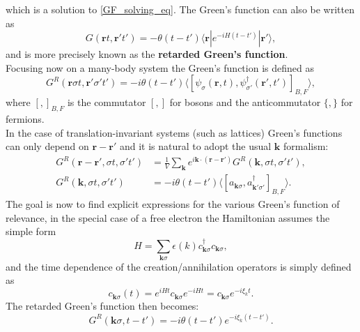 which is a solution to \ref{GF_solving_eq}.
The Green's function can also be written as
\begin{equation}
    G(\mathbf{r}t,\mathbf{r}'t')=-\theta(t-t')\langle \mathbf{r}|e^{-iH(t-t')}|\mathbf{r}'\rangle,
\end{equation}
and is more precisely known as the \textbf{retarded Green's function}.\\
Focusing now on a many-body system the Green's function is defined as
\begin{equation}
    G^R(\mathbf{r}\sigma t,\mathbf{r}'\sigma't')=-i\theta(t-t')\langle[\psi_\sigma(\mathbf{r},t),\psi^\dagger_{\sigma'}(\mathbf{r}',t')]_{B,F}\rangle,
\end{equation}
where $[,]_{B,F}$ is the commutator $[,]$ for bosons and the anticommutator $\{,\}$ for fermions.\\
In the case of translation-invariant systems (such as lattices) Green's functions can only depend on $\mathbf{r}-\mathbf{r}'$ and 
it is natural to adopt the usual $\mathbf{k}$ formalism:
\begin{equation}
\begin{split}
    G^R(\mathbf{r}-\mathbf{r}',\sigma t,\sigma' t')&=\frac{1}{V}\sum_\mathbf{k}e^{i\mathbf{k}\cdot(\mathbf{r}-\mathbf{r}')}G^R(\mathbf{k},\sigma t,\sigma' t'),\\
    G^R(\mathbf{k},\sigma t,\sigma' t')&=-i\theta (t-t')\langle [a_{\mathbf{k}\sigma},a^\dagger_{\mathbf{k}'\sigma'}]_{B,F}\rangle.
\end{split}
    \label{GF_momentum_space}
\end{equation}
The goal is now to find explicit expressions for the various Green's function of relevance, in the special case of a free electron 
the Hamiltonian assumes the simple form
\begin{equation}
    H=\sum_{\mathbf{k}\sigma}\epsilon(k)c^\dagger_{\mathbf{k}\sigma}c_{\mathbf{k}\sigma}, 
\end{equation}
and the time dependence of the creation/annihilation operators is simply defined as
\begin{equation}
    c_{\mathbf{k}\sigma}(t)=e^{iHt}c_{\mathbf{k}\sigma}e^{-iHt}=c_{\mathbf{k}\sigma}e^{-i\xi_kt}.
\end{equation}
The retarded Green's function then becomes:
\begin{equation}
    G^R(\mathbf{k}\sigma,t-t')=-i\theta(t-t')e^{-i\xi_k(t-t')}.
\end{equation}

